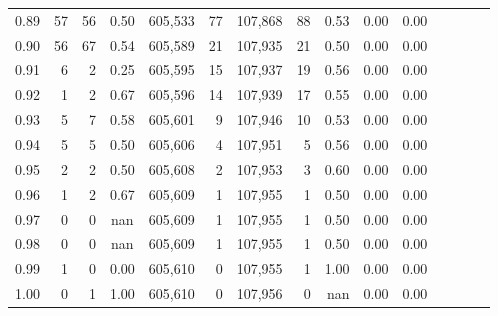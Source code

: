 \begin{tabular}{rrrcrrrrrrrrrrr}
0.89 &      57 &     56 &                                       0.50 &  605,533 &       77 &  107,868 &       88 &  0.53 &  0.00 &                         0.00 \\
0.90 &      56 &     67 &                                       0.54 &  605,589 &       21 &  107,935 &       21 &  0.50 &  0.00 &                         0.00 \\
0.91 &       6 &      2 &                                       0.25 &  605,595 &       15 &  107,937 &       19 &  0.56 &  0.00 &                         0.00 \\
0.92 &       1 &      2 &                                       0.67 &  605,596 &       14 &  107,939 &       17 &  0.55 &  0.00 &                         0.00 \\
0.93 &       5 &      7 &                                       0.58 &  605,601 &        9 &  107,946 &       10 &  0.53 &  0.00 &                         0.00 \\
0.94 &       5 &      5 &                                       0.50 &  605,606 &        4 &  107,951 &        5 &  0.56 &  0.00 &                         0.00 \\
0.95 &       2 &      2 &                                       0.50 &  605,608 &        2 &  107,953 &        3 &  0.60 &  0.00 &                         0.00 \\
0.96 &       1 &      2 &                                       0.67 &  605,609 &        1 &  107,955 &        1 &  0.50 &  0.00 &                         0.00 \\
0.97 &       0 &      0 &                                        nan &  605,609 &        1 &  107,955 &        1 &  0.50 &  0.00 &                         0.00 \\
0.98 &       0 &      0 &                                        nan &  605,609 &        1 &  107,955 &        1 &  0.50 &  0.00 &                         0.00 \\
0.99 &       1 &      0 &                                       0.00 &  605,610 &        0 &  107,955 &        1 &  1.00 &  0.00 &                         0.00 \\
1.00 &       0 &      1 &                                       1.00 &  605,610 &        0 &  107,956 &        0 &   nan &  0.00 &                         0.00 \\
\bottomrule
\end{tabular}
